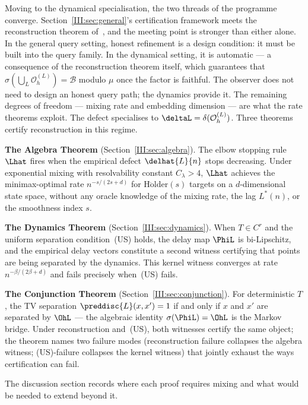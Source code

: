 Moving to the dynamical specialisation, the two threads of the programme
converge.  Section~\ref{III:sec:general}'s certification framework meets the
reconstruction theorem of~\cite{mahon_paper2}, and the meeting point is
stronger than either alone.  In the general query setting, honest refinement
is a design condition: it must be built into the query family.  In the
dynamical setting, it is automatic --- a consequence of the reconstruction
theorem itself, which guarantees that $\sigma(\bigcup_L \mathcal{O}_h^{(L)})
= \mathcal{B}$ modulo $\mu$ once the factor is faithful.  The observer does
not need to design an honest query path; the dynamics provide it.  The
remaining degrees of freedom --- mixing rate and embedding dimension --- are
what the rate theorems exploit.  The defect specialises to
$\deltaL = \delta(\mathcal{O}_h^{(L)})$.  Three theorems certify
reconstruction in this regime.

\textbf{The Algebra Theorem} (Section~\ref{III:sec:algebra}).
The elbow stopping rule $\Lhat$ fires when the empirical defect
$\delhat{L}{n}$ stops decreasing.
Under exponential mixing with resolvability constant $C_\lambda > 4$,
$\Lhat$ achieves the minimax-optimal rate $n^{-s/(2s+d)}$ for
$\mathrm{H\ddot{o}lder}(s)$ targets on a $d$-dimensional state space,
without any oracle knowledge of the mixing rate, the lag $L^*(n)$,
or the smoothness index $s$.

\textbf{The Dynamics Theorem} (Section~\ref{III:sec:dynamics}).
When $T \in C^r$ and the uniform separation condition~(US) holds,
the delay map $\PhiL$ is bi-Lipschitz, and the empirical delay vectors
constitute a second witness certifying that points are being separated by
the dynamics.  This kernel witness converges at rate $n^{-\beta/(2\beta+d)}$
and fails precisely when~(US) fails.

\textbf{The Conjunction Theorem} (Section~\ref{III:sec:conjunction}).
For deterministic $T$, the TV separation $\preddisc{L}(x,x') = 1$ if and
only if $x$ and $x'$ are separated by $\OhL$ --- the algebraic identity
$\sigma(\PhiL) = \OhL$ is the Markov bridge.  Under reconstruction and~(US),
both witnesses certify the same object; the theorem names two failure modes
(reconstruction failure collapses the algebra witness; (US)-failure collapses
the kernel witness) that jointly exhaust the ways certification can fail.

The discussion section records where each proof requires mixing and what
would be needed to extend beyond it.

